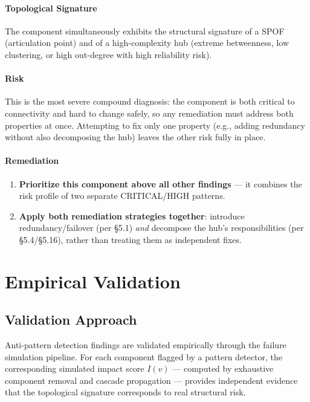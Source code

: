 \documentclass[11pt]{article}
\begin{document}
\paragraph{Topological Signature}
The component simultaneously exhibits the structural signature of a SPOF (articulation point) and of a high-complexity hub (extreme betweenness, low clustering, or high out-degree with high reliability risk).

\paragraph{Risk}
This is the most severe compound diagnosis: the component is both critical to connectivity and hard to change safely, so any remediation must address both properties at once. Attempting to fix only one property (e.g., adding redundancy without also decomposing the hub) leaves the other risk fully in place.

\paragraph{Remediation}
\begin{enumerate}[leftmargin=*]
\item \textbf{Prioritize this component above all other findings} --- it combines the risk profile of two separate CRITICAL/HIGH patterns.
\item \textbf{Apply both remediation strategies together}: introduce redundancy/failover (per \S5.1) \emph{and} decompose the hub's responsibilities (per \S5.4/\S5.16), rather than treating them as independent fixes.
\end{enumerate}

\section{Empirical Validation}

\subsection{Validation Approach}

Anti-pattern detection findings are validated empirically through the failure simulation pipeline. For each component flagged by a pattern detector, the corresponding simulated impact score $I(v)$ --- computed by exhaustive component removal and cascade propagation --- provides independent evidence that the topological signature corresponds to real structural risk.
\end{document}
